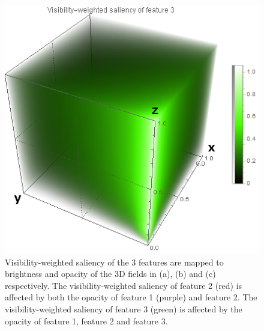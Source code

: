 \begin{figure}
\begin{minipage}{.3\textwidth}
		\subcaption{}
	\end{minipage}
	\begin{minipage}{.3\textwidth}
		\includegraphics[width=1\linewidth]{images/nucleon_strong_red_densityplot3}
		\subcaption{}
	\end{minipage}
	\caption{Visibility-weighted saliency of the 3 features are mapped to brightness and opacity of the 3D fields in (a), (b) and (c) respectively. The visibility-weighted saliency of feature 2 (red) is affected by both the opacity of feature 1 (purple) and feature 2. The visibility-weighted saliency of feature 3 (green) is affected by the opacity of feature 1, feature 2 and feature 3.}
	\label{fig:nucleon_densityplot}
\end{figure}

